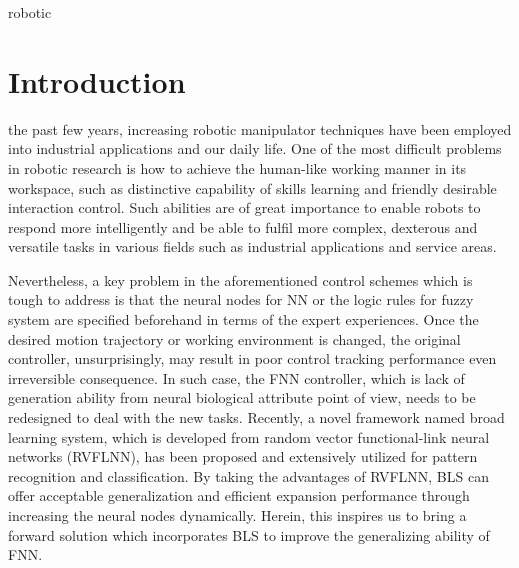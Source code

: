 \documentclass[journal]{IEEEtran}
\begin{document}
\begin{IEEEkeywords}
    robotic
\end{IEEEkeywords}

\section{Introduction}
 the past few years, increasing robotic manipulator techniques have been employed into industrial applications and our daily life. One of the most difficult problems in robotic research is how to achieve the human-like working manner in its workspace, such as distinctive capability of skills learning and friendly desirable interaction control. Such abilities are of great importance to enable robots to respond more intelligently and be able to fulfil more complex, dexterous and versatile tasks in various fields such as industrial applications and service areas.

Nevertheless, a key problem in the aforementioned control schemes which is tough to address is that the neural nodes for NN or the logic rules for fuzzy system are specified beforehand in terms of the expert experiences. Once the desired motion trajectory or working environment is changed, the original controller, unsurprisingly, may result in poor control tracking performance even irreversible consequence. In such case, the FNN controller, which is lack of generation ability from neural biological attribute point of view, needs to be redesigned to deal with the new tasks. Recently, a novel framework named broad learning system, which is developed from random vector functional-link neural networks (RVFLNN), has been proposed and extensively utilized for pattern recognition and classification. By taking the advantages of RVFLNN, BLS can offer acceptable generalization and efficient expansion performance through increasing the neural nodes dynamically. Herein, this inspires us to bring a forward solution which incorporates BLS to improve the generalizing ability of FNN.
\end{document}
